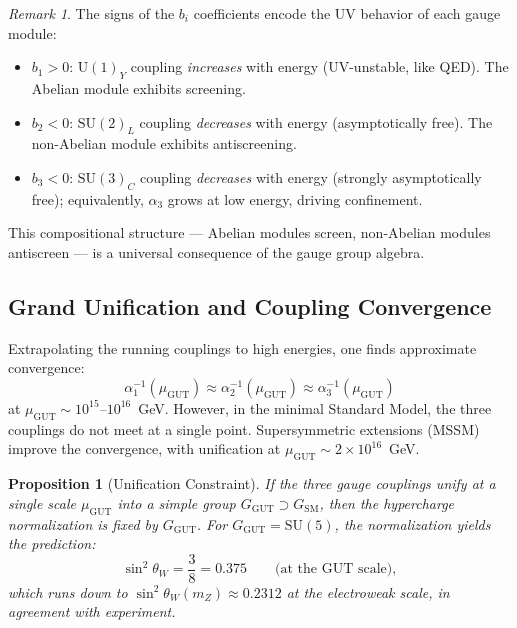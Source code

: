 \documentclass[12pt]{article}
\newtheorem{proposition}[theorem]{Proposition}
\theoremstyle{definition}
\theoremstyle{remark}
\newtheorem{remark}[theorem]{Remark}
\newcommand{\su}[1]{\mathrm{SU}(#1)}
\newcommand{\uu}[1]{\mathrm{U}(#1)}
\newcommand{\sinw}{\sin^2\!\theta_W}
\begin{document}
\begin{remark}
The signs of the $b_i$ coefficients encode the UV behavior of each gauge module:
\begin{itemize}
\item $b_1 > 0$: $\uu{1}_Y$ coupling \emph{increases} with energy (UV-unstable, like QED). The Abelian module exhibits screening.
\item $b_2 < 0$: $\su{2}_L$ coupling \emph{decreases} with energy (asymptotically free). The non-Abelian module exhibits antiscreening.
\item $b_3 < 0$: $\su{3}_C$ coupling \emph{decreases} with energy (strongly asymptotically free); equivalently, $\alpha_3$ grows at low energy, driving confinement.
\end{itemize}
This compositional structure --- Abelian modules screen, non-Abelian modules antiscreen --- is a universal consequence of the gauge group algebra.
\end{remark}

\subsection{Grand Unification and Coupling Convergence}

Extrapolating the running couplings to high energies, one finds approximate convergence:
\begin{equation}
\alpha_1^{-1}(\mu_{\mathrm{GUT}}) \approx \alpha_2^{-1}(\mu_{\mathrm{GUT}}) \approx \alpha_3^{-1}(\mu_{\mathrm{GUT}})
\end{equation}
at $\mu_{\mathrm{GUT}} \sim 10^{15}$--$10^{16}$~GeV. However, in the minimal Standard Model, the three couplings do not meet at a single point. Supersymmetric extensions (MSSM) improve the convergence, with unification at $\mu_{\mathrm{GUT}} \sim 2 \times 10^{16}$~GeV.

\begin{proposition}[Unification Constraint]
\label{prop:unification}
If the three gauge couplings unify at a single scale $\mu_{\mathrm{GUT}}$ into a simple group $G_{\mathrm{GUT}} \supset G_{\mathrm{SM}}$, then the hypercharge normalization is fixed by $G_{\mathrm{GUT}}$. For $G_{\mathrm{GUT}} = \su{5}$, the normalization yields the prediction:
\begin{equation}
\sinw = \frac{3}{8} = 0.375 \qquad \text{(at the GUT scale)},
\end{equation}
which runs down to $\sinw(m_Z) \approx 0.2312$ at the electroweak scale, in agreement with experiment.
\end{proposition}
\end{document}
